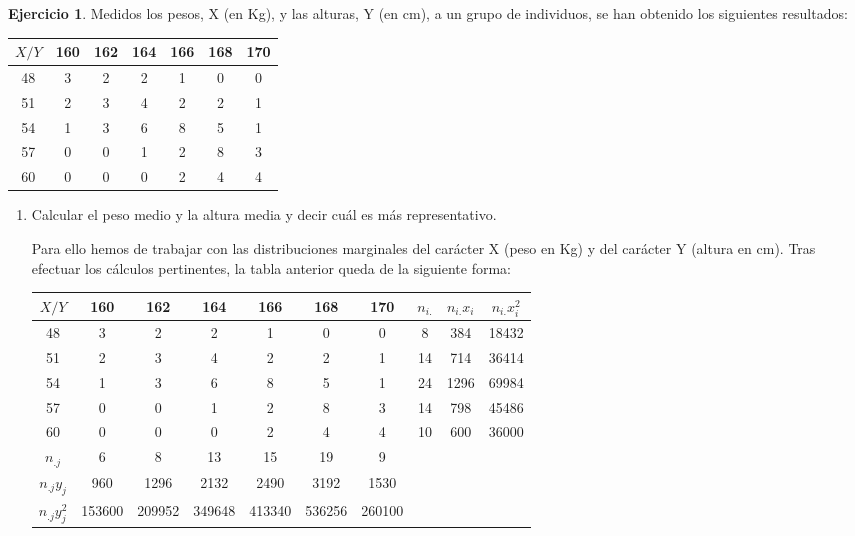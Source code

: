 \documentclass[a4paper, 12pt]{article}
\theoremstyle{definition}
\newtheorem{ej}{Ejercicio}
\begin{document}
\begin{ej}
Medidos los pesos, X (en Kg), y las alturas, Y (en cm), a un grupo de individuos, se han obtenido
los siguientes resultados:

\begin{center}
\begin{tabular}{c|cccccc}
	\(X/Y\) & 160 & 162 & 164 & 166 & 168 & 170 \\
	\hline
	48 & 3 & 2 & 2 & 1 & 0 & 0 \\
	51 & 2 & 3 & 4 & 2 & 2 & 1 \\
	54 & 1 & 3 & 6 & 8 & 5 & 1 \\
	57 & 0 & 0 & 1 & 2 & 8 & 3 \\
	60 & 0 & 0 & 0 & 2 & 4 & 4\\
\end{tabular}
\end{center}

\begin{center}
\end{center}

\begin{enumerate}[label=\alph*)]
	\item Calcular el peso medio y la altura media y decir cuál es más representativo.
	
	Para ello hemos de trabajar con las distribuciones marginales del carácter X (peso en Kg) y del carácter Y (altura en cm). Tras efectuar los cálculos pertinentes, la tabla anterior queda de la siguiente forma:
	
	\begin{center}
\begin{tabular}{c|ccccccccc}
	\(X/Y\) & 160 & 162 & 164 & 166 & 168 & 170 & \(n_{i.}\) & \(n_{i.}x_i\) & \(n_{i.}x_i^2\) \\
	\hline
	48 & 3 & 2 & 2 & 1 & 0 & 0 & 8 & 384 & 18432 \\
	51 & 2 & 3 & 4 & 2 & 2 & 1 & 14 & 714 & 36414\\
	54 & 1 & 3 & 6 & 8 & 5 & 1 & 24 & 1296 & 69984\\
	57 & 0 & 0 & 1 & 2 & 8 & 3 & 14 & 798 & 45486\\
	60 & 0 & 0 & 0 & 2 & 4 & 4 & 10 & 600 & 36000\\
	\(n_{.j}\) & 6 & 8 & 13 & 15 & 19 & 9\\
	\(n_{.j} y_j\) & 960 & 1296 & 2132 & 2490 & 3192 & 1530\\
	\(n_{.j} y_j^2\) & 153600 & 209952 & 349648 & 413340 & 536256 & 260100\\
\end{tabular}
\end{center}


\end{enumerate}
\end{ej}
\end{document}
